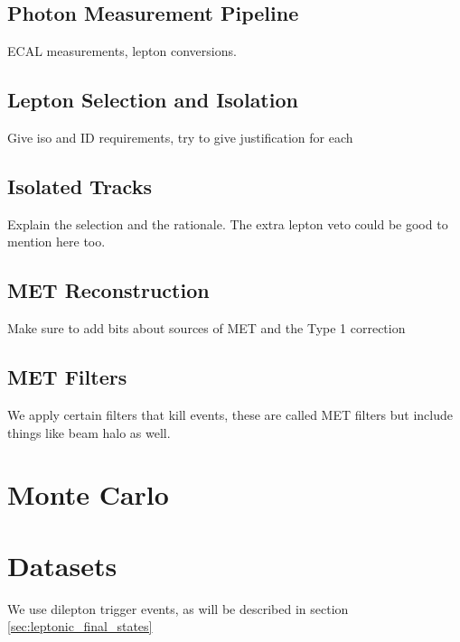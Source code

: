 \subsection{Photon Measurement Pipeline}
ECAL measurements, lepton conversions.
\subsection{Lepton Selection and Isolation}
Give iso and ID requirements, try to give justification for each
\subsection{Isolated Tracks}
Explain the selection and the rationale. The extra lepton veto could be good to mention here too. 
\subsection{MET Reconstruction} \label{sec:MET_reco}
  Make sure to add bits about sources of MET and the Type 1 correction
\subsection{MET Filters} \label{sec:met_filters} 
  We apply certain filters that kill events, these are called MET filters but include things like beam halo as well.

\section{Monte Carlo}

\section{Datasets} \label{sec:datasets}
We use dilepton trigger events, as will be described in section \ref{sec:leptonic_final_states}